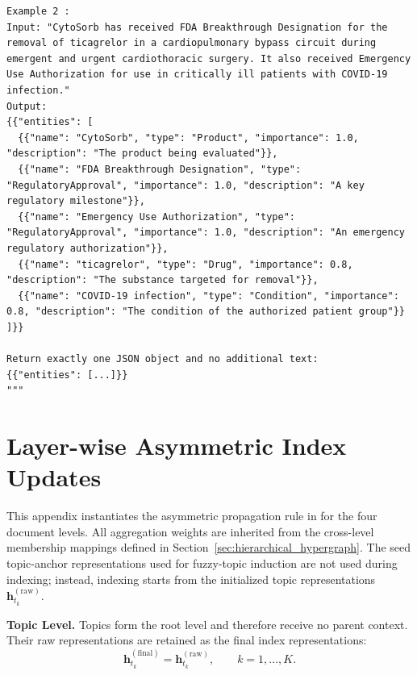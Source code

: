 \documentclass{article} %
\begin{document}
\begin{lstlisting}
Example 2 :
Input: "CytoSorb has received FDA Breakthrough Designation for the removal of ticagrelor in a cardiopulmonary bypass circuit during emergent and urgent cardiothoracic surgery. It also received Emergency Use Authorization for use in critically ill patients with COVID-19 infection."
Output:
{{"entities": [
  {{"name": "CytoSorb", "type": "Product", "importance": 1.0, "description": "The product being evaluated"}},
  {{"name": "FDA Breakthrough Designation", "type": "RegulatoryApproval", "importance": 1.0, "description": "A key regulatory milestone"}},
  {{"name": "Emergency Use Authorization", "type": "RegulatoryApproval", "importance": 1.0, "description": "An emergency regulatory authorization"}},
  {{"name": "ticagrelor", "type": "Drug", "importance": 0.8, "description": "The substance targeted for removal"}},
  {{"name": "COVID-19 infection", "type": "Condition", "importance": 0.8, "description": "The condition of the authorized patient group"}}
]}}

Return exactly one JSON object and no additional text:
{{"entities": [...]}}
"""
\end{lstlisting}

\section{Layer-wise Asymmetric Index Updates}
\label{app:asymmetric_indexing_details}

This appendix instantiates the asymmetric propagation rule in  for the four document levels. All aggregation weights are inherited from the cross-level membership mappings defined in Section~\ref{sec:hierarchical_hypergraph}. The seed topic-anchor representations used for fuzzy-topic induction are not used during indexing; instead, indexing starts from the initialized topic representations $\mathbf{h}_{t_k}^{(\mathrm{raw})}$.

\smallskip
\noindent\textbf{Topic Level.}
Topics form the root level and therefore receive no parent context. Their raw representations are retained as the final index representations:
\begin{equation}
\mathbf{h}_{t_k}^{(\mathrm{final})}
=
\mathbf{h}_{t_k}^{(\mathrm{raw})},
\qquad
k=1,\ldots,K.
\label{eq:topic_final_representation}
\end{equation}
\end{document}
